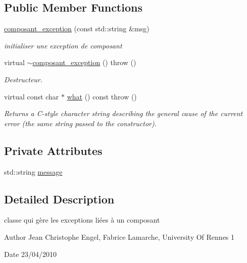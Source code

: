 \subsection*{Public Member Functions}
\begin{DoxyCompactItemize}
\item 
\hyperlink{classcomposant__exception_ae8cd86b9e3658238da8ff51a0a2c203d}{composant\-\_\-exception} (const std\-::string \&msg)
\begin{DoxyCompactList}\small\item\em initialiser une exception de composant \end{DoxyCompactList}\item 
virtual \hyperlink{classcomposant__exception_a412573cc5c9971c4be701f83a6a04b27}{$\sim$composant\-\_\-exception} ()  throw ()
\begin{DoxyCompactList}\small\item\em Destructeur. \end{DoxyCompactList}\item 
virtual const char $\ast$ \hyperlink{classcomposant__exception_aa679ff8d1a722c19de72fde0b5ad3ff5}{what} () const   throw ()
\begin{DoxyCompactList}\small\item\em Returns a C-\/style character string describing the general cause of the current error (the same string passed to the constructor). \end{DoxyCompactList}\end{DoxyCompactItemize}
\subsection*{Private Attributes}
\begin{DoxyCompactItemize}
\item 
std\-::string \hyperlink{classcomposant__exception_abe83485fc365a1e427d76b49c27b5037}{message}
\end{DoxyCompactItemize}


\subsection{Detailed Description}
classe qui gère les exceptions liées à un composant 

\begin{DoxyAuthor}{Author}
Jean Christophe Engel, Fabrice Lamarche, University Of Rennes 1 
\end{DoxyAuthor}
\begin{DoxyDate}{Date}
23/04/2010 
\end{DoxyDate}


